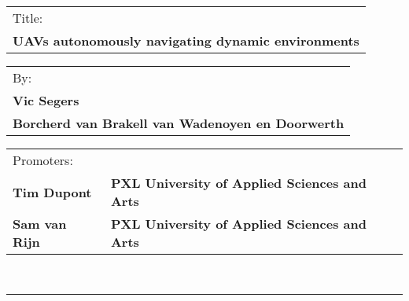 \begin{tabular}{l}
  Title:\\
  \textbf{UAVs autonomously navigating dynamic environments}\\
\end{tabular}

\begin{tabular}{l}
  By:\\
  \textbf{Vic Segers}\\
  \textbf{Borcherd van Brakell van Wadenoyen en Doorwerth}\\
\end{tabular}

\begin{tabular}{l l}
  Promoters:\\
  \textbf{Tim Dupont} & \textbf{PXL University of Applied Sciences and Arts}\\
  \textbf{Sam van Rijn} & \textbf{PXL University of Applied Sciences and Arts}\\
\end{tabular}\\
\rule{\textwidth}{1pt}